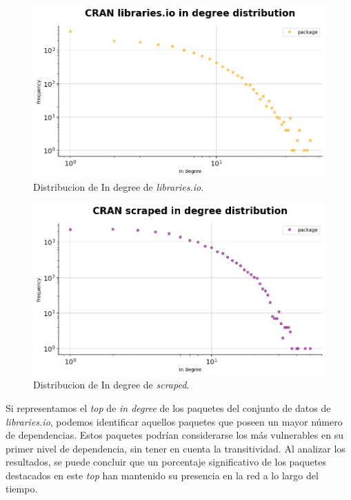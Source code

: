 \begin{figure}[h!]
    \begin{center}
        \includegraphics[width=1\textwidth]{img/cran/ind_lib.png}
        \caption{Distribucion de In degree de \textit{libraries.io}.}
        \label{fig:cran_in_lib}
    \end{center}
\end{figure}

\begin{figure}[h!]
    \begin{center}
        \includegraphics[width=1\textwidth]{img/cran/ind_scr.png}
        \caption{Distribucion de In degree de \textit{scraped}.}
        \label{fig:cran_in_scraped}
    \end{center}
\end{figure}


Si representamos el \textit{top} de \textit{in degree} de los paquetes del conjunto de datos
de \textit{libraries.io}, podemos identificar aquellos paquetes que poseen un mayor número de
dependencias. Estos paquetes podrían considerarse los más vulnerables en su primer nivel de dependencia,
sin tener en cuenta la transitividad. Al analizar los resultados, se puede concluir que un porcentaje
significativo de los paquetes destacados en este \textit{top} han mantenido su presencia en la red a
lo largo del tiempo.

